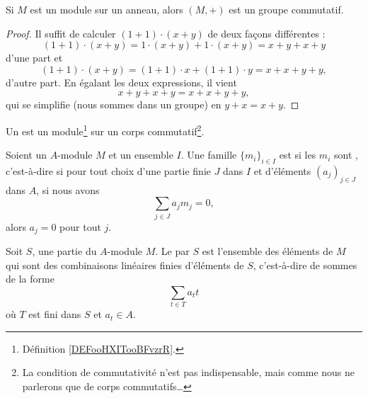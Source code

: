 \begin{proposition}\label{PROPooGARGooDiMqtN}
	Si \( M\) est un module sur un anneau, alors \( (M,+)\) est un groupe commutatif.
\end{proposition}

\begin{proof}
	Il suffit de calculer \( (1+1)\cdot (x+y)\) de deux façons différentes :
	\begin{equation}
		(1+1)\cdot (x+y)=1\cdot (x+y)+1\cdot (x+y)=x+y+x+y
	\end{equation}
	d'une part et
	\begin{equation}
		(1+1)\cdot (x+y)=(1+1)\cdot x+(1+1)\cdot y=x+x+y+y,
	\end{equation}
	d'autre part. En égalant les deux expressions, il vient
	\begin{equation}
		x+y+x+y=x+x+y+y,
	\end{equation}
	qui se simplifie (nous sommes dans un groupe) en \( y+x=x+y\).
\end{proof}

\begin{definition}\label{DEFooKHWZooIfxdNc}
	Un  est un module\footnote{Définition \ref{DEFooHXITooBFvzrR}.} sur un corps commutatif\footnote{La condition de commutativité n'est pas indispensable, mais comme nous ne parlerons que de corps commutatifs\ldots}.
\end{definition}

\begin{definition}        \label{DEFooRUKVooLnXxdS}
	Soient un \( A\)-module \( M\) et un ensemble \( I\). Une famille \( \{ m_i \}_{i\in I}\) est  si les \( m_i\) sont , c'est-à-dire si pour tout choix d'une partie finie \( J\) dans \( I\) et d'éléments \( (a_j)_{j\in J}\) dans \( A\), si nous avons
	\begin{equation}
		\sum_{j\in J}a_jm_j=0,
	\end{equation}
	alors \( a_j=0\) pour tout \( j\).
\end{definition}

\begin{definition}        \label{DEFooWBOBooJNyyBF}
	Soit \( S\), une partie du \( A\)-module \( M\). Le  par \( S\) est l'ensemble des éléments de \( M\) qui sont des combinaisons linéaires finies d'éléments de \( S\), c'est-à-dire de sommes de la forme
	\begin{equation}
		\sum_{t\in T}a_tt
	\end{equation}
	où \( T\) est fini dans \( S\) et \( a_t\in A\).
\end{definition}

